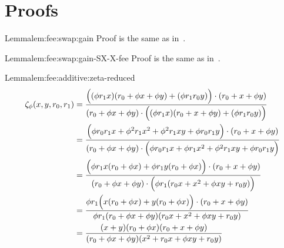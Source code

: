 \chapter{Proofs}


\begin{proofof}{Lemma}{lem:fee:swap:gain}
    Proof is the same as in~\cite{BCL22lmcs}.
\end{proofof}

\begin{proofof}{Lemma}{lem:fee:swap:gain-SX-X-fee}
    Proof is the same as in~\cite{BCL22lmcs}.
\end{proofof}

\begin{proofof}{Lemma}{lem:fee:additive:zeta-reduced}
    \begin{align*}
        \Z x y {r_0} {r_1} & =
        \frac
            {\Big ( (\fee \ammR[1] x)(\ammR[0] + \fee x + \fee y) + (\fee \ammR[1] \ammR[0] y)\Big ) \cdot (\ammR[0] + x + \fee y)}
            {(\ammR[0] + \fee x + \fee y) \cdot \Big ( (\fee \ammR[1] x)(\ammR[0] + x + \fee y) + (\fee \ammR[1] \ammR[0] y)\Big )}
        \\
        & = 
        \frac
            {\Big ( \fee \ammR[0] \ammR[1] x + \fee ^ 2 \ammR[1] x^2 + \fee^2 \ammR[1] x y + \fee \ammR[0] \ammR[1] y\Big ) \cdot (\ammR[0] + x + \fee y)}
            {(\ammR[0] + \fee x + \fee y) \cdot \Big ( \fee \ammR[0] \ammR[1] x + \fee \ammR[1] x^2 + \fee^2 \ammR[1] x y + \fee \ammR[0] \ammR[1] y \Big )}
        \\
        & = 
        \frac
            {\Big ( \fee \ammR[1] x (\ammR[0] + \fee x) + \fee \ammR[1] y (\ammR[0] + \fee x)\Big ) \cdot (\ammR[0] + x + \fee y)}
            {(\ammR[0] + \fee x + \fee y) \cdot \Big ( \fee \ammR[1] (\ammR[0] x + x^2 + \fee x y + \ammR[0] y) \Big )}
        \\
        & = 
        \frac
            {\fee \ammR[1] \Big ( x (\ammR[0] + \fee x) + y (\ammR[0] + \fee x)\Big ) \cdot (\ammR[0] + x + \fee y)}
            {\fee \ammR[1] (\ammR[0] + \fee x + \fee y) (\ammR[0] x + x^2 + \fee x y + \ammR[0] y)}
        \\
        & = 
        \frac
        {(x + y)(\ammR[0] + \fee x)(\ammR[0] + x + \fee y)}
        {(\ammR[0] + \fee x + \fee y)(x^2 + \ammR[0] x +\fee x y + \ammR[0] y)} 
    \end{align*}
\end{proofof}

